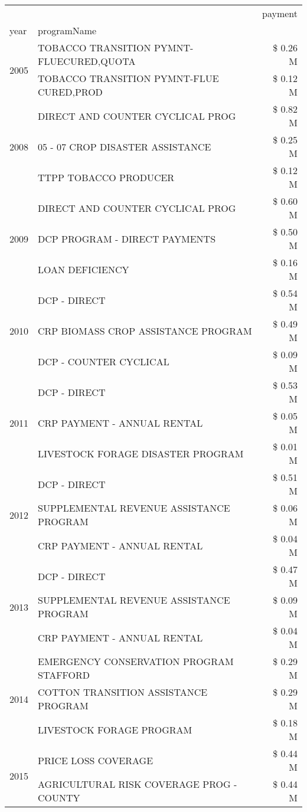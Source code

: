 \begin{tabular}{llr}
\toprule
 &  & payment \\
year & programName &  \\
\midrule
\multirow[t]{2}{*}{2005} & TOBACCO TRANSITION PYMNT-FLUECURED,QUOTA & \$ 0.26 M \\
 & TOBACCO TRANSITION PYMNT-FLUE CURED,PROD & \$ 0.12 M \\
\cline{1-3}
\multirow[t]{3}{*}{2008} & DIRECT AND COUNTER CYCLICAL PROG & \$ 0.82 M \\
 & 05 - 07 CROP DISASTER ASSISTANCE & \$ 0.25 M \\
 & TTPP TOBACCO PRODUCER & \$ 0.12 M \\
\cline{1-3}
\multirow[t]{3}{*}{2009} & DIRECT AND COUNTER CYCLICAL PROG & \$ 0.60 M \\
 & DCP PROGRAM - DIRECT PAYMENTS & \$ 0.50 M \\
 & LOAN DEFICIENCY & \$ 0.16 M \\
\cline{1-3}
\multirow[t]{3}{*}{2010} & DCP - DIRECT & \$ 0.54 M \\
 & CRP BIOMASS CROP ASSISTANCE PROGRAM & \$ 0.49 M \\
 & DCP - COUNTER CYCLICAL & \$ 0.09 M \\
\cline{1-3}
\multirow[t]{3}{*}{2011} & DCP - DIRECT & \$ 0.53 M \\
 & CRP PAYMENT - ANNUAL RENTAL & \$ 0.05 M \\
 & LIVESTOCK FORAGE DISASTER PROGRAM & \$ 0.01 M \\
\cline{1-3}
\multirow[t]{3}{*}{2012} & DCP - DIRECT & \$ 0.51 M \\
 & SUPPLEMENTAL REVENUE ASSISTANCE PROGRAM & \$ 0.06 M \\
 & CRP PAYMENT - ANNUAL RENTAL & \$ 0.04 M \\
\cline{1-3}
\multirow[t]{3}{*}{2013} & DCP - DIRECT & \$ 0.47 M \\
 & SUPPLEMENTAL REVENUE ASSISTANCE PROGRAM & \$ 0.09 M \\
 & CRP PAYMENT - ANNUAL RENTAL & \$ 0.04 M \\
\cline{1-3}
\multirow[t]{3}{*}{2014} & EMERGENCY CONSERVATION PROGRAM STAFFORD & \$ 0.29 M \\
 & COTTON TRANSITION ASSISTANCE PROGRAM & \$ 0.29 M \\
 & LIVESTOCK FORAGE PROGRAM & \$ 0.18 M \\
\cline{1-3}
\multirow[t]{3}{*}{2015} & PRICE LOSS COVERAGE & \$ 0.44 M \\
 & AGRICULTURAL RISK COVERAGE PROG - COUNTY & \$ 0.44 M \\

\end{tabular}

